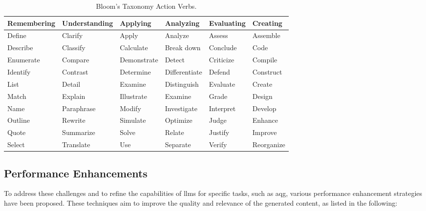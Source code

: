 \begin{table}[htbp]
   \centering
   \renewcommand{\arraystretch}{1.6}
   \caption{Bloom's Taxonomy Action Verbs.}
   \label{tab:blooms_verbs_columns}
   \begin{tabularx}{\textwidth}{|>{\hsize=1.15\hsize\centering\arraybackslash}X|>{\hsize=1.25\hsize\centering\arraybackslash}X|>{\hsize=0.95\hsize\centering\arraybackslash}X|>{\hsize=0.95\hsize\centering\arraybackslash}X|>{\hsize=0.9\hsize\centering\arraybackslash}X|>{\hsize=0.8\hsize\centering\arraybackslash}X|}
     \hline
     \rowcolor{gray!15}
     \textbf{Remembering} & \textbf{Understanding} & \textbf{Applying} & \textbf{Analyzing} & \textbf{Evaluating} & \textbf{Creating} \\
     \hline
     Define & Clarify & Apply & Analyze & Assess & Assemble \\
     \hline
     Describe & Classify & Calculate & Break down & Conclude & Code \\
     \hline
     Enumerate & Compare & Demonstrate & Detect & Criticize & Compile \\
     \hline
     Identify & Contrast & Determine & Differentiate & Defend & Construct \\
     \hline
     List & Detail & Examine & Distinguish & Evaluate & Create \\
     \hline
     Match & Explain & Illustrate & Examine & Grade & Design \\
     \hline
     Name & Paraphrase & Modify & Investigate & Interpret & Develop \\
     \hline
     Outline & Rewrite & Simulate & Optimize & Judge & Enhance \\
     \hline
     Quote & Summarize & Solve & Relate & Justify & Improve \\
     \hline
     Select & Translate & Use & Separate & Verify & Reorganize \\
     \hline
   \end{tabularx}
 \end{table}

\subsection{Performance Enhancements}
\label{sec:performance-enhancements}

To address these challenges and to refine the capabilities of \ac{llms} for specific tasks, such as \ac{aqg}, various performance enhancement strategies have been proposed. These techniques aim to improve the quality and relevance of the generated content, as listed in the following:

